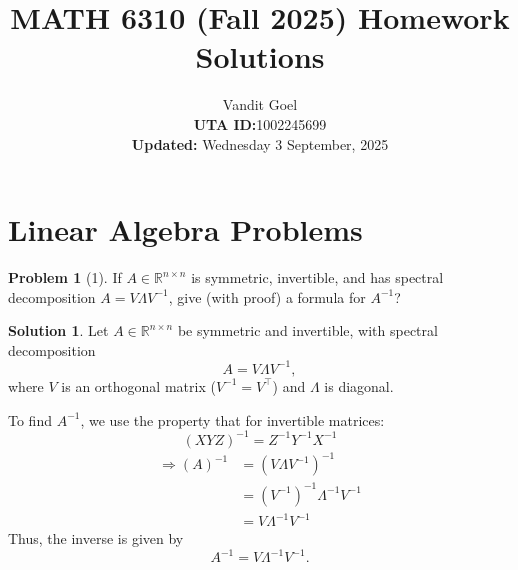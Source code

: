 \documentclass{amsart}[11pt]
\title{MATH 6310 (Fall 2025) Homework Solutions}
\author{Vandit Goel\\\textbf{UTA ID:}1002245699\\\textbf{Updated:} Wednesday  3 September, 2025}
\theoremstyle{definition}
\newtheorem*{problem}{Problem}
\newtheorem*{solution}{Solution}
\newcommand{\R}{\mathbb{R}}
\begin{document}
\maketitle

\section{Linear Algebra Problems}

\begin{problem}[1]
If $A\in\R^{n\times n}$ is symmetric, invertible, and has spectral decomposition $A=V\Lambda V^{-1}$, give (with proof) a formula for $A^{-1}$?

\begin{solution}
Let $A \in \mathbb{R}^{n \times n}$ be symmetric and invertible, with spectral decomposition
\[
A = V \Lambda V^{-1},
\]
where $V$ is an orthogonal matrix ($V^{-1} = V^\top$) and $\Lambda$ is diagonal.

\vspace{\baselineskip}
\noindent To find $A^{-1}$, we use the property that for invertible matrices:
\[
(XYZ)^{-1} = Z^{-1} Y^{-1} X^{-1}
\]
\begin{align*}
	\Rightarrow(A)^{-1} &= (V \Lambda V^{-1})^{-1} \\
	&= (V^{-1})^{-1}\Lambda^{-1} V^{-1} \\
	&= V\Lambda^{-1} V^{-1}
\end{align*}
Thus, the inverse is given by
\[
A^{-1} = V \Lambda^{-1} V^{-1}.
\]
\end{solution}
\end{problem}
\end{document}
